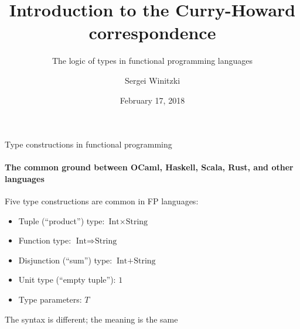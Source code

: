 \documentclass[english]{beamer}
\title[Introduction to Curry-Howard]{Introduction to the Curry-Howard
correspondence}
\subtitle{The logic of types in functional programming languages}
\author{Sergei Winitzki}
\date{February 17, 2018}
\institute[ABTB]{Academy by the Bay}
\begin{document}
\frame{\titlepage}
\begin{frame}{Type constructions in functional programming}


\framesubtitle{The common ground between OCaml, Haskell, Scala, Rust, and other
languages}

Five type constructions are common in FP languages:
\begin{itemize}
\item Tuple (``product'') type: $\text{Int}\times\text{String}$
\item Function type: $\text{Int}\Rightarrow\text{String}$
\item Disjunction (``sum'') type: $\text{Int}+\text{String}$
\item Unit type (``empty tuple''): $1$
\item Type parameters: $T$
\end{itemize}
The syntax is different; the meaning is the same
\end{frame}
\end{document}
